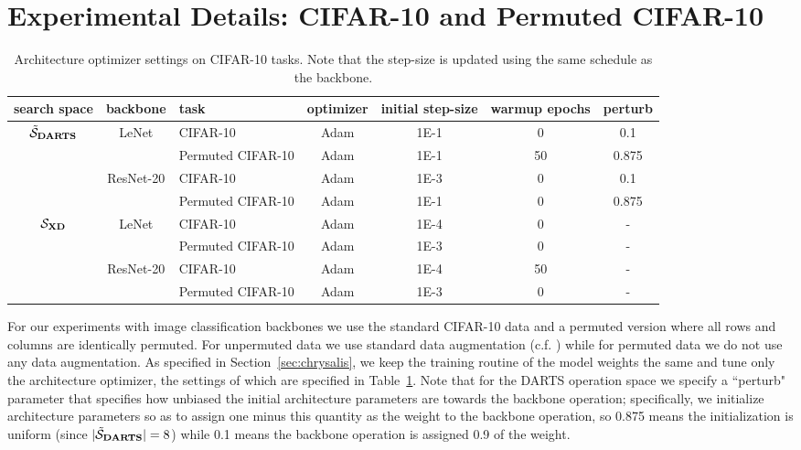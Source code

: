 
\section{Experimental Details: CIFAR-10 and Permuted CIFAR-10}

\begin{table}[!h]
	\centering
	\begin{threeparttable}
		\begin{tabular}{cclcccc}
			\hline
			search space & backbone & task & optimizer & initial step-size & warmup epochs & perturb \\
			\hline
			\multirow{4}{*}{$\tilde{\mathcal S}_{\mathbf{DARTS}}$}
			& \multirow{2}{*}{LeNet}
			& CIFAR-10 & Adam & 1E-1 & 0 & 0.1 \\
			&& Permuted CIFAR-10 & Adam & 1E-1 & 50 & 0.875 \\
			\cline{2-7}
			& \multirow{2}{*}{ResNet-20}
			& CIFAR-10 & Adam & 1E-3 & 0 & 0.1 \\
			&& Permuted CIFAR-10 & Adam & 1E-1 & 0 & 0.875 \\
			\hline
			\multirow{4}{*}{$\mathcal S_{\mathbf{XD}}$}
			& \multirow{2}{*}{LeNet}
			& CIFAR-10 & Adam & 1E-4 & 0 & - \\
			&& Permuted CIFAR-10 & Adam & 1E-3 & 0 & -\\
			\cline{2-7}
			& \multirow{2}{*}{ResNet-20}
			& CIFAR-10 & Adam & 1E-4 & 50 & - \\
			&& Permuted CIFAR-10 & Adam & 1E-3 & 0 & - \\
			\hline
		\end{tabular}
		\caption{\label{app:tab:cifar}
			Architecture optimizer settings on CIFAR-10 tasks.
			Note that the step-size is updated using the same schedule as the backbone.
		}
	\end{threeparttable}
\end{table}

For our experiments with image classification backbones we use the standard CIFAR-10 data \citep{krizhevsky2009cifar} and a permuted version where all rows and columns are identically permuted.
For unpermuted data we use standard data augmentation (c.f. \citet{he2016resnet}) while for permuted data we do not use any data augmentation.
As specified in Section~\ref{sec:chrysalis}, we keep the training routine of the model weights the same and tune only the architecture optimizer, the settings of which are specified in Table~\ref{app:tab:cifar}.
Note that for the DARTS operation space we specify a ``perturb" parameter that specifies how unbiased the initial architecture parameters are towards the backbone operation;
specifically, we initialize architecture parameters so as to assign one minus this quantity as the weight to the backbone operation, so 0.875 means the initialization is uniform (since $|\tilde{\mathcal S}_{\mathbf{DARTS}}|=8$) while 0.1 means the backbone operation is assigned 0.9 of the weight.

